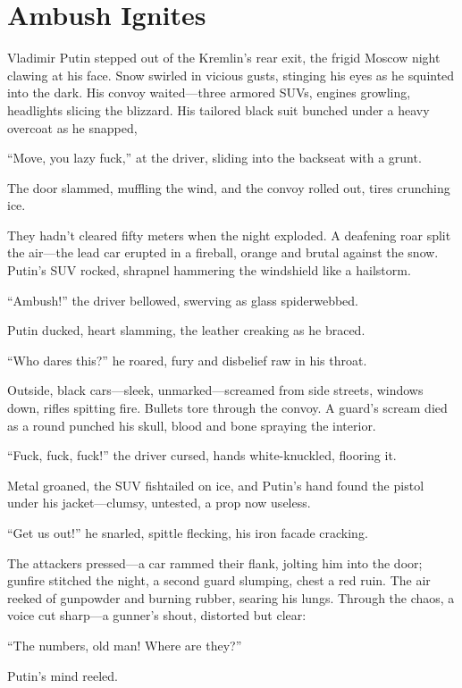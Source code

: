 \documentclass[12pt]{book}
\begin{document}
\section{Ambush Ignites}

Vladimir Putin stepped out of the Kremlin’s rear exit, the frigid Moscow night clawing at his face. Snow swirled in vicious gusts, stinging his eyes as he squinted into the dark. His convoy waited---three armored SUVs, engines growling, headlights slicing the blizzard. His tailored black suit bunched under a heavy overcoat as he snapped,

\enquote{Move, you lazy fuck,} at the driver, sliding into the backseat with a grunt.

The door slammed, muffling the wind, and the convoy rolled out, tires crunching ice.

They hadn’t cleared fifty meters when the night exploded. A deafening roar split the air---the lead car erupted in a fireball, orange and brutal against the snow. Putin’s SUV rocked, shrapnel hammering the windshield like a hailstorm.

\enquote{Ambush!} the driver bellowed, swerving as glass spiderwebbed.

Putin ducked, heart slamming, the leather creaking as he braced.

\enquote{Who dares this?} he roared, fury and disbelief raw in his throat.

Outside, black cars---sleek, unmarked---screamed from side streets, windows down, rifles spitting fire. Bullets tore through the convoy. A guard’s scream died as a round punched his skull, blood and bone spraying the interior.

\enquote{Fuck, fuck, fuck!} the driver cursed, hands white-knuckled, flooring it.

Metal groaned, the SUV fishtailed on ice, and Putin’s hand found the pistol under his jacket---clumsy, untested, a prop now useless.

\enquote{Get us out!} he snarled, spittle flecking, his iron facade cracking.

The attackers pressed---a car rammed their flank, jolting him into the door; gunfire stitched the night, a second guard slumping, chest a red ruin. The air reeked of gunpowder and burning rubber, searing his lungs. Through the chaos, a voice cut sharp---a gunner’s shout, distorted but clear:

\enquote{The numbers, old man! Where are they?}

Putin’s mind reeled.
\end{document}
